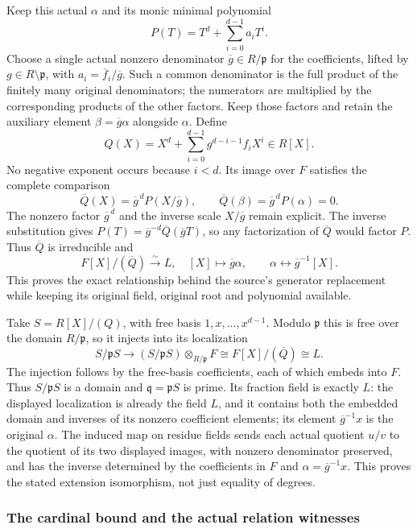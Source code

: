 Keep this actual \(\alpha\) and its monic minimal polynomial \[
 P(T)=T^d+\sum_{i=0}^{d-1}a_iT^i.
\] Choose a single actual nonzero denominator \(\overline g\in R/\mathfrak p\) for the coefficients, lifted by \(g\in R\setminus\mathfrak p\), with \(a_i=\overline f_i/\overline g\). Such a common denominator is the full product of the finitely many original denominators; the numerators are multiplied by the corresponding products of the other factors. Keep those factors and retain the auxiliary element \(\beta=\overline g\alpha\) alongside \(\alpha\). Define \[
 Q(X)=X^d+\sum_{i=0}^{d-1}g^{d-i-1}f_iX^i\in R[X].
\] No negative exponent occurs because \(i<d\). Its image over \(F\) satisfies the complete comparison \[
 \overline Q(X)=\overline g^{\,d}P(X/\overline g),
 \qquad
 \overline Q(\beta)=\overline g^{\,d}P(\alpha)=0.
\] The nonzero factor \(\overline g^{\,d}\) and the inverse scale \(X/\overline g\) remain explicit. The inverse substitution gives \(P(T)=\overline g^{-d}\overline Q(\overline gT)\), so any factorization of \(\overline Q\) would factor \(P\). Thus \(\overline Q\) is irreducible and \[
 F[X]/(\overline Q)\xrightarrow{\sim}L,\quad [X]\longmapsto\overline g\alpha,
 \qquad \alpha\longleftrightarrow\overline g^{-1}[X].
\] This proves the exact relationship behind the source's generator replacement while keeping its original field, original root and polynomial available.

Take \(S=R[X]/(Q)\), with free basis \(1,x,\ldots,x^{d-1}\). Modulo \(\mathfrak p\) this is free over the domain \(R/\mathfrak p\), so it injects into its localization \[
 S/\mathfrak pS\longrightarrow
 (S/\mathfrak pS)\otimes_{R/\mathfrak p}F
       \cong F[X]/(\overline Q)\cong L.
\] The injection follows by the free-basis coefficients, each of which embeds into \(F\). Thus \(S/\mathfrak pS\) is a domain and \(\mathfrak q=\mathfrak pS\) is prime. Its fraction field is exactly \(L\): the displayed localization is already the field \(L\), and it contains both the embedded domain and inverses of its nonzero coefficient elements; its element \(\overline g^{-1}x\) is the original \(\alpha\). The induced map on residue fields sends each actual quotient \(u/v\) to the quotient of its two displayed images, with nonzero denominator preserved, and has the inverse determined by the coefficients in \(F\) and \(\alpha=\overline g^{-1}x\). This proves the stated extension isomorphism, not just equality of degrees.

\subsubsection{The cardinal bound and the actual relation witnesses}\label{the-cardinal-bound-and-the-actual-relation-witnesses}

